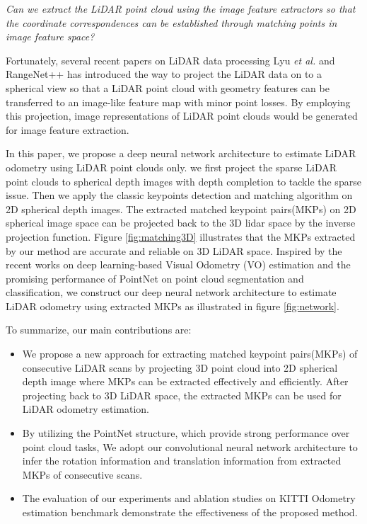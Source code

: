 \documentclass[sigconf]{acmart}
\def\etal{\emph{et al. }}
\begin{document}
\emph{Can we extract the LiDAR point cloud using the image feature extractors so that the coordinate correspondences can be established through matching points in image feature space?}

Fortunately, several recent papers on LiDAR data processing Lyu \etal{} \cite{lyu2018real,lyu2018chipnet} and RangeNet++ \cite{milioto2019rangenet++} has introduced the way to project the LiDAR data on to a spherical view so that a LiDAR point cloud with geometry features can be transferred to an image-like feature map with minor point losses. By employing this projection, image representations of LiDAR point clouds would be generated for image feature extraction.

In this paper, we propose a deep neural network architecture to estimate LiDAR odometry using LiDAR point clouds only. we first project the sparse LiDAR point clouds to spherical depth images with depth completion to tackle the sparse issue. Then we apply the classic keypoints detection and matching algorithm on 2D spherical depth images. The extracted matched keypoint pairs(MKPs) on 2D spherical image space can be projected back to the 3D lidar space by the inverse projection function. Figure \ref{fig:matching3D} illustrates that the MKPs extracted by our method are accurate and reliable on 3D LiDAR space. Inspired by the recent works on deep learning-based Visual Odometry (VO) estimation and the promising performance of PointNet\cite{qi2017pointnet} on point cloud segmentation and classification, we construct our deep neural network architecture to estimate LiDAR odometry using extracted MKPs as illustrated in figure \ref{fig:network}.   

To summarize, our main contributions are:
\begin{itemize}
\item We propose a new approach for extracting matched keypoint pairs(MKPs) of consecutive LiDAR scans by projecting 3D point cloud into 2D spherical depth image where MKPs can be extracted effectively and efficiently. After projecting back to 3D LiDAR space, the extracted MKPs can be used for LiDAR odometry estimation. 
\item By utilizing the PointNet structure, which provide strong performance over point cloud tasks, We adopt our convolutional neural network architecture to infer the rotation information and translation information from extracted MKPs of consecutive scans.
\item The evaluation of our experiments and ablation studies on KITTI Odometry estimation benchmark\cite{kitti} demonstrate the effectiveness of the proposed method. 
\end{itemize}
\end{document}
